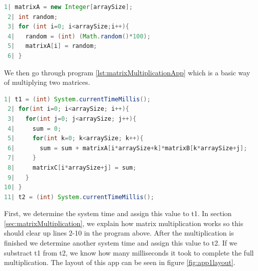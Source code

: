\documentclass[a4paper, 11pt]{report}
\begin{document}
\begin{lstlisting}[caption={Creating matrix},captionpos=b, label={lst:createMatrix}, language=java, float=ht]
 1| matrixA = new Integer[arraySize];
 2| int random;
 3| for (int i=0; i<arraySize;i++){
 4|   random = (int) (Math.random()*100);
 5|   matrixA[i] = random;
 6| }
\end{lstlisting}
We then go through program \ref{lst:matrixMultiplicationApp} which is a basic way of multiplying two matrices.
\begin{lstlisting}[caption={Code for matrix multiplication on Android phone},captionpos=b, label={lst:matrixMultiplicationApp}, language=java, float=ht]
 1| t1 = (int) System.currentTimeMillis();
 2| for(int i=0; i<arraySize; i++){
 3|   for(int j=0; j<arraySize; j++){
 4|     sum = 0;
 5|     for(int k=0; k<arraySize; k++){
 6|       sum = sum + matrixA[i*arraySize+k]*matrixB[k*arraySize+j];
 7|     }
 8|     matrixC[i*arraySize+j] = sum;
 9|   }
10| }
11| t2 = (int) System.currentTimeMillis();
\end{lstlisting}

First, we determine the system time and assign this value to t1. In section \ref{sec:matrixMultiplication}, we explain how matrix multiplication works so this should clear up lines 2-10 in the program above. After the multiplication is finished we determine another system time and assign this value to t2. If we substract t1 from t2, we know how many milliseconds it took to complete the full multiplication. The layout of this app can be seen in figure \ref{fig:app1layout}.
\end{document}

